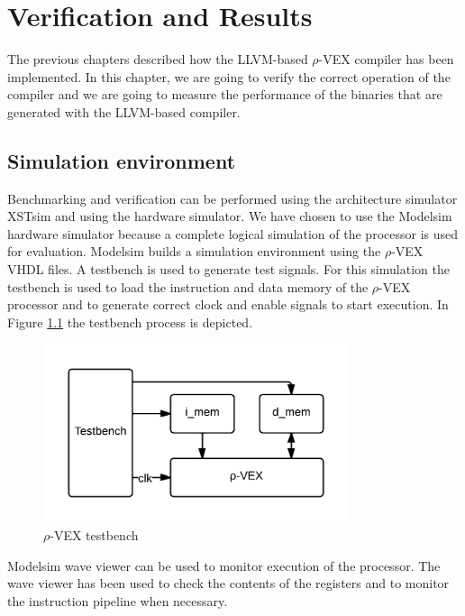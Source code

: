 \chapter{Verification and Results}
\label{chap:results}
The previous chapters described how the LLVM-based $\rho$-VEX compiler has been implemented. In this chapter, we are going to verify the correct operation of the compiler and we are going to measure the performance of the binaries that are generated with the LLVM-based compiler.

\section{Simulation environment}

Benchmarking and verification can be performed using the architecture simulator XSTsim and using the hardware simulator. We have chosen to use the Modelsim hardware simulator because a complete logical simulation of the processor is used for evaluation. Modelsim builds a simulation environment using the $\rho$-VEX VHDL files. A testbench is used to generate test signals. For this simulation the testbench is used to load the instruction and data memory of the $\rho$-VEX processor and to generate correct clock and enable signals to start execution. In Figure \ref{fig:rvex_tb} the testbench process is depicted.

\begin{figure}[ht]
\centering
\includegraphics[width=0.8\textwidth]{5_results/img/testbench.png}
\caption{$\rho$-VEX testbench}
\label{fig:rvex_tb}
\end{figure}

Modelsim wave viewer can be used to monitor execution of the processor. The wave viewer has been used to check the contents of the registers and to monitor the instruction pipeline when necessary.


